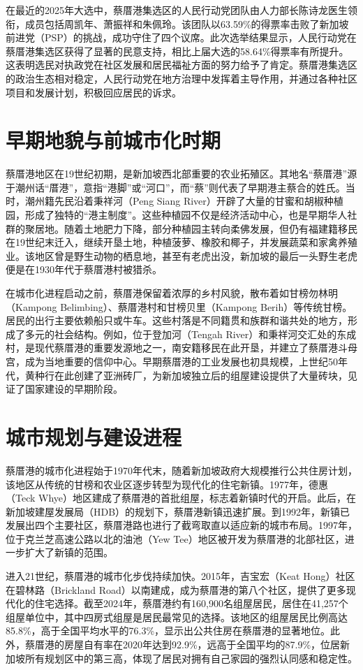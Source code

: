 \documentclass[11pt,a4paper,twoside,openany]{book}
\begin{document}
在最近的2025年大选中，蔡厝港集选区的人民行动党团队由人力部长陈诗龙医生领衔，成员包括周凯年、萧振祥和朱佩玲。该团队以63.59\%的得票率击败了新加坡前进党（PSP）的挑战，成功守住了四个议席。此次选举结果显示，人民行动党在蔡厝港集选区获得了显著的民意支持，相比上届大选的58.64\%得票率有所提升。这表明选民对执政党在社区发展和居民福祉方面的努力给予了肯定。蔡厝港集选区的政治生态相对稳定，人民行动党在地方治理中发挥着主导作用，并通过各种社区项目和发展计划，积极回应居民的诉求。

\section{早期地貌与前城市化时期}
蔡厝港地区在19世纪初期，是新加坡西北部重要的农业拓殖区。其地名“蔡厝港”源于潮州话“厝港”，意指“港脚”或“河口”，而“蔡”则代表了早期港主蔡合的姓氏。当时，潮州籍先民沿着秉祥河（Peng Siang River）开辟了大量的甘蜜和胡椒种植园，形成了独特的“港主制度”。这些种植园不仅是经济活动中心，也是早期华人社群的聚居地。随着土地肥力下降，部分种植园主转向柔佛发展，但仍有福建籍移民在19世纪末迁入，继续开垦土地，种植菠萝、橡胶和椰子，并发展蔬菜和家禽养殖业。该地区曾是野生动物的栖息地，甚至有老虎出没，新加坡的最后一头野生老虎便是在1930年代于蔡厝港村被猎杀。

在城市化进程启动之前，蔡厝港保留着浓厚的乡村风貌，散布着如甘榜勿林明（Kampong Belimbing）、蔡厝港村和甘榜贝里（Kampong Berih）等传统甘榜。居民的出行主要依赖船只或牛车。这些村落是不同籍贯和族群和谐共处的地方，形成了多元的社会结构。例如，位于登加河（Tengah River）和秉祥河交汇处的东成村，是现代蔡厝港的重要发源地之一，南安籍移民在此开垦，并建立了蔡厝港斗母宫，成为当地重要的信仰中心。早期蔡厝港的工业发展也初具规模，上世纪50年代，黄种行在此创建了亚洲砖厂，为新加坡独立后的组屋建设提供了大量砖块，见证了国家建设的早期阶段。

\section{城市规划与建设进程}
蔡厝港的城市化进程始于1970年代末，随着新加坡政府大规模推行公共住房计划，该地区从传统的甘榜和农业区逐步转型为现代化的住宅新镇。1977年，德惠（Teck Whye）地区建成了蔡厝港的首批组屋，标志着新镇时代的开启。此后，在新加坡建屋发展局（HDB）的规划下，蔡厝港新镇迅速扩展。到1992年，新镇已发展出四个主要社区，蔡厝港路也进行了截弯取直以适应新的城市布局。1997年，位于克兰芝高速公路以北的油池（Yew Tee）地区被开发为蔡厝港的北部社区，进一步扩大了新镇的范围。

进入21世纪，蔡厝港的城市化步伐持续加快。2015年，吉宝宏（Keat Hong）社区在碧林路（Brickland Road）以南建成，成为蔡厝港的第八个社区，提供了更多现代化的住宅选择。截至2024年，蔡厝港约有160,900名组屋居民，居住在41,257个组屋单位中，其中四房式组屋是居民最常见的选择。该地区的组屋居民比例高达85.8\%，高于全国平均水平的76.3\%，显示出公共住房在蔡厝港的显著地位。此外，蔡厝港的房屋自有率在2020年达到92.9\%，远高于全国平均的87.9\%，位居新加坡所有规划区中的第三高，体现了居民对拥有自己家园的强烈认同感和稳定性。
\end{document}

